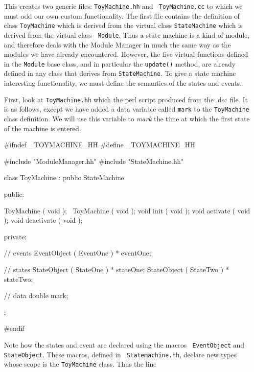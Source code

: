 \medskip
{}
\medskip

\noindent This creates two generic files: {\tt ToyMachine.hh} and {\tt
ToyMachine.cc} to which we must add our own custom functionality. The first file
contains the definition of class {\tt ToyMachine} which is derived from the
virtual class {\tt StateMachine} which is derived from the virtual class {\tt
Module}. Thus a state machine is a kind of module, and therefore deals with the
Module Manager in much the same way as the modules we have already
encountered. However, the five virtual functions defined in the {\tt Module}
base class, and in particular the {\tt update()} method, are already defined in
any class that derives from {\tt StateMachine}. To give a state machine
interesting functionality, we must define the semantics of the states and
events.

First, look at {\tt ToyMachine.hh} which the perl script produced from the
{\*.dsc} file. It is as follows, except we have added a data variable called
{\tt mark} to the {\tt ToyMachine} class definition. We will use this
variable to {\em mark} the time at which the first state of the machine is
entered.

\begin{codesegment}
  #ifndef _TOYMACHINE_HH
  #define _TOYMACHINE_HH

  #include "ModuleManager.hh"
  #include "StateMachine.hh"

  class ToyMachine : public StateMachine {

    public:

      ToyMachine ( void );
      ~ToyMachine ( void );
      void init ( void );
      void activate ( void );
      void deactivate ( void );

    private:

      // events
      EventObject ( EventOne ) * eventOne;

      // states
      StateObject ( StateOne ) * stateOne;
      StateObject ( StateTwo ) * stateTwo;

      // data
      double mark;
  };

  #endif
\end{codesegment}

\noindent Note how the states and event are declared using the macros {\tt
  EventObject} and {\tt StateObject}. These macros, defined in {\tt
  Statemachine.hh}, declare new types whose scope is the {\tt ToyMachine}
  class. Thus the line

